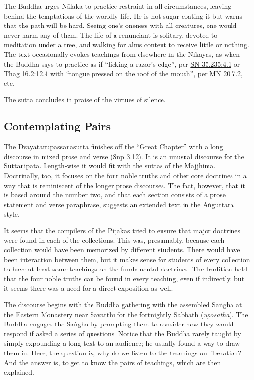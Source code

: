 \documentclass[12pt,openany]{book}%
\begin{document}
The Buddha urges \textsanskrit{Nālaka} to practice restraint in all circumstances, leaving behind the temptations of the worldly life. He is not sugar-coating it but warns that the path will be hard. Seeing one’s oneness with all creatures, one would never harm any of them. The life of a renunciant is solitary, devoted to meditation under a tree, and walking for alms content to receive little or nothing. The text occasionally evokes teachings from elsewhere in the \textsanskrit{Nikāyas}, as when the Buddha says to practice as if “licking a razor’s edge”, per \href{https://suttacentral.net/sn35.235/en/sujato\#4.1}{SN 35.235:4.1} or \href{https://suttacentral.net/thag16.2/en/sujato\#12.4}{Thag 16.2:12.4} with “tongue pressed on the roof of the mouth”, per \href{https://suttacentral.net/mn20/en/sujato\#7.2}{MN 20:7.2}, etc.

The sutta concludes in praise of the virtues of silence.

\subsection*{Contemplating Pairs}

The \textsanskrit{Dvayatānupassanāsutta} finishes off the “Great Chapter” with a long discourse in mixed prose and verse (\href{https://suttacentral.net/snp3.12/en/sujato}{Snp 3.12}). It is an unusual discourse for the \textsanskrit{Suttanipāta}. Length-wise it would fit with the suttas of the Majjhima. Doctrinally, too, it focuses on the four noble truths and other core doctrines in a way that is reminiscent of the longer prose discourses. The fact, however, that it is based around the number two, and that each section consists of a prose statement and verse paraphrase, suggests an extended text in the \textsanskrit{Aṅguttara} style.

It seems that the compilers of the \textsanskrit{Piṭakas} tried to ensure that major doctrines were found in each of the collections. This was, presumably, because each collection would have been memorized by different students. There would have been interaction between them, but it makes sense for students of every collection to have at least some teachings on the fundamental doctrines. The tradition held that the four noble truths can be found in every teaching, even if indirectly, but it seems there was a need for a direct exposition as well.

The discourse begins with the Buddha gathering with the assembled \textsanskrit{Saṅgha} at the Eastern Monastery near \textsanskrit{Sāvatthī} for the fortnightly Sabbath (\textit{uposatha}). The Buddha engages the \textsanskrit{Saṅgha} by prompting them to consider how they would respond if asked a series of questions. Notice that the Buddha rarely taught by simply expounding a long text to an audience; he usually found a way to draw them in. Here, the question is, why do we listen to the teachings on liberation? And the answer is, to get to know the pairs of teachings, which are then explained.
\end{document}
